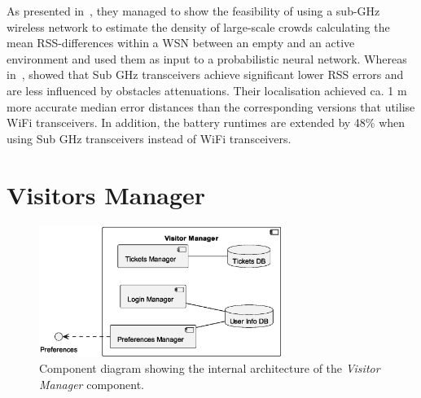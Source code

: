 As presented in~\cite{denis2018large}, they managed to show the feasibility of using a sub-GHz wireless network to estimate the
density of large-scale crowds calculating the mean RSS-differences within a WSN between an empty and an active environment and used them
as input to a probabilistic neural network.
Whereas in~\cite{fudickar2014comparing}, showed that Sub GHz transceivers achieve significant lower RSS errors and are less influenced by obstacles attenuations.
Their localisation achieved ca. 1 m more accurate median error distances than the corresponding versions that utilise WiFi transceivers.
In addition, the battery runtimes are extended by 48\% when using Sub GHz transceivers instead of WiFi transceivers.


\section{Visitors Manager}

\begin{figure}[H]
	\centering
	\includegraphics[width=0.7\textwidth]{img/visitor-manager.eps}
	\caption{Component diagram showing the internal architecture of the \textit{Visitor Manager} component.
	}
	\label{fig:visitor-manager-arch}
\end{figure}